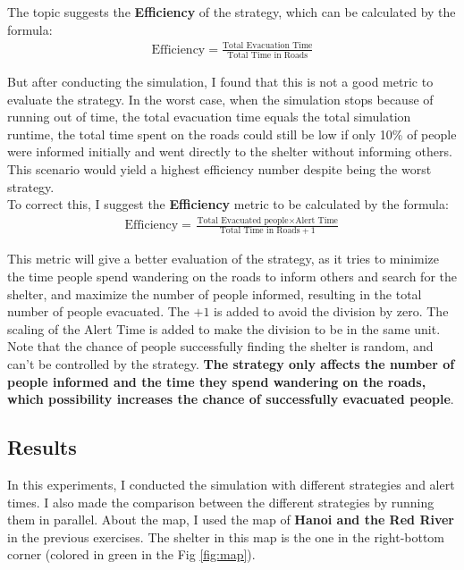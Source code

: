 \documentclass[12pt]{article}
\begin{document}
The topic suggests the \textbf{Efficiency} of the strategy, which can be calculated by the formula:
\begin{align*}
    \text{Efficiency} = \frac{\text{Total Evacuation Time}}{\text{Total Time in Roads}}
\end{align*}

But after conducting the simulation, I found that this is not a good metric to evaluate the strategy. In the worst case, when the simulation stops because of running out of time, the total evacuation time equals the total simulation runtime, the total time spent on the roads could still be low if only 10\% of people were informed initially and went directly to the shelter without informing others. This scenario would yield a highest efficiency number despite being the worst strategy.\\

To correct this, I suggest the \textbf{Efficiency} metric to be calculated by the formula:
\begin{align*}
    \text{Efficiency} = \frac{\text{Total Evacuated people} \times \text{Alert Time}}{\text{Total Time in Roads} + 1}
\end{align*}

This metric will give a better evaluation of the strategy, as it tries to minimize the time people spend wandering on the roads to inform others and search for the shelter, and maximize the number of people informed, resulting in the total number of people evacuated. The $\text{+1}$ is added to avoid the division by zero. The scaling of the $\text{Alert Time}$ is added to make the division to be in the same unit.\\

Note that the chance of people successfully finding the shelter is random, and can't be controlled by the strategy. \textbf{The strategy only affects the number of people informed and the time they spend wandering on the roads, which possibility increases the chance of successfully evacuated people}.\\

\subsection{Results}

In this experiments, I conducted the simulation with different strategies and alert times. I also made the comparison between the different strategies by running them in parallel. About the map, I used the map of \textbf{Hanoi and the Red River} in the previous exercises. The shelter in this map is the one in the right-bottom corner (colored in green in the Fig \ref{fig:map}).\\ 
\end{document}
